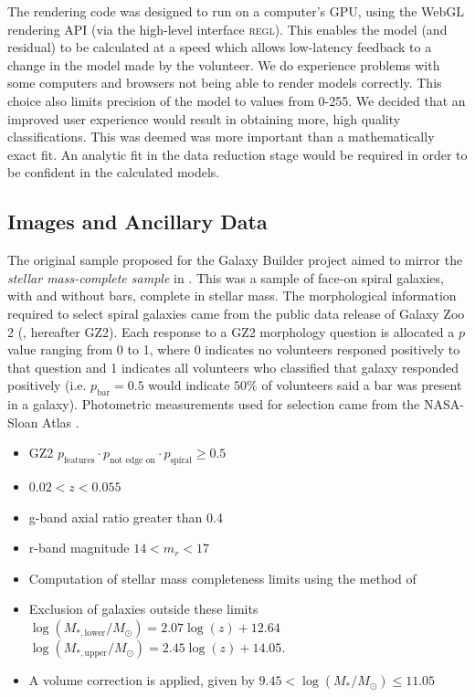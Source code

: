 \documentclass[../main.tex]{subfiles}
\begin{document}
The rendering code was designed to run on a computer's GPU, using the WebGL rendering API (via the high-level interface \textsc{regl}). This enables the model (and residual) to be calculated at a speed which allows low-latency feedback to a change in the model made by the volunteer. We do experience problems with some computers and browsers not being able to render models correctly. This choice also limits precision of the model to values from 0-255. We decided that an improved user experience would result in obtaining more, high quality classifications. This was deemed was more important than a mathematically exact fit. An analytic fit in the data reduction stage would be required in order to be confident in the calculated models.

\subsection{Images and Ancillary Data}
\label{sec:data}
The original sample proposed for the Galaxy Builder project aimed to mirror the \textit{stellar mass-complete sample} in \citet{Hart2017:1708.04628v1}. This was a sample of face-on spiral galaxies, with and without bars, complete in stellar mass. The morphological information required to select spiral galaxies came from the public data release of Galaxy Zoo 2 (\citealt{Willett2013:1308.3496v2}, hereafter GZ2). Each response to a GZ2 morphology question is allocated a $p$ value ranging from 0 to 1, where 0 indicates no volunteers responed positively to that question and 1 indicates all volunteers who classified that galaxy responded positively (i.e. $p_\text{bar} = 0.5$ would indicate $50\%$ of volunteers said a bar was present in a galaxy). Photometric measurements used for selection came from the NASA-Sloan Atlas \citep{2011AJ....142...31B}.


\begin{itemize}
  \item GZ2 $p_\text{features} \cdot p_\text{not edge on} \cdot p_\text{spiral} \ge 0.5$
  \item $0.02 < z < 0.055$
  \item g-band axial ratio greater than 0.4 
  \item r-band magnitude $14 < m_r < 17$
  \item Computation of stellar mass completeness limits using the method of \citet{Pozzetti2009:0907.5416v2}
  \item Exclusion of galaxies outside these limits\\
    $\log({M_{*,\text{lower}} / M_\odot}) = 2.07\log(z) + 12.64$\\
    $\log({M_{*,\text{upper}} / M_\odot}) = 2.45\log(z) + 14.05$.
  \item A volume correction is applied, given by $9.45 < \log(M_* / M_\odot) \le 11.05$
\end{itemize}
\end{document}
